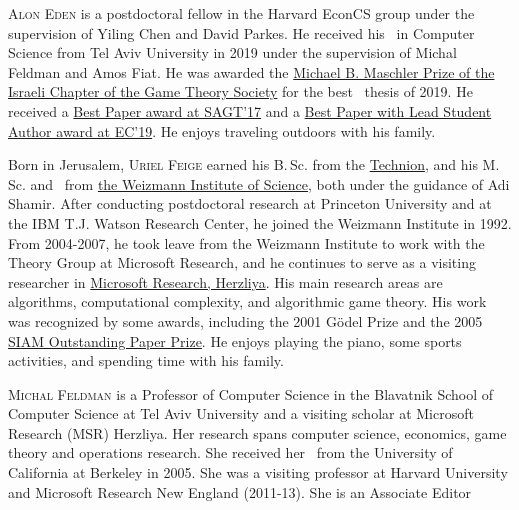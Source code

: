 \documentclass{toc}
\theoremstyle{plain}
\begin{document}
%
%
%
%
%
%
%
%
%
%
%
%
%
%
\begin{tocaboutauthors}
\begin{tocabout}[eden]  %
  \textsc{Alon Eden} is a postdoctoral fellow in the Harvard EconCS group under the supervision of Yiling Chen and David Parkes.  He received his \phd\ in Computer Science from Tel Aviv University in 2019 under the supervision of Michal Feldman and Amos Fiat. He was awarded the \href{https://sites.google.com/view/themichaelbmaschlerprize/recipients}{Michael B. Maschler Prize of the Israeli Chapter of the Game Theory Society} for the best \phd\ thesis of 2019.  He received a \href{https://cs.gssi.it/sagt2017/program.php}{Best Paper award at SAGT'17} and a \href{https://www.sigecom.org/award-paper.html}{Best Paper with Lead Student Author award at EC'19}. He enjoys traveling outdoors with his family.  
\end{tocabout}
\begin{tocabout}[feige]
  Born in Jerusalem, \textsc{Uriel Feige} earned his B.\,Sc. from the \href{https://vee.technion.ac.il}{Technion}, and his M.\,Sc. and \phd\ from \href{http://www.weizmann.ac.il/math}{the Weizmann Institute of Science}, both under the guidance of Adi Shamir. After conducting postdoctoral research at Princeton University and at the IBM T.J. Watson Research Center, he joined the Weizmann Institute in 1992. From 2004-2007, he took leave from the Weizmann Institute to work with
%
the Theory Group at Microsoft Research,  %
and he continues to serve as a visiting researcher in \href{https://www.microsoft.com/en-us/research/group/microsoft-research-new-england-herzliya}{Microsoft Research, %
Herzliya}.  %
His main research areas are algorithms, computational complexity, and algorithmic game theory. His work was recognized by some awards, including the 2001 %
G\"odel  %
Prize and the 2005 \href{https://archive.siam.org/prizes/sponsored/outstanding_paper.php}{SIAM Outstanding Paper Prize}. He enjoys playing the piano, some sports activities, and spending time with his family.
\end{tocabout}
\begin{tocabout}[feldman]
  \textsc{Michal Feldman} is a Professor of Computer Science in the Blavatnik School of Computer Science at Tel Aviv University and a visiting scholar at Microsoft Research (MSR) Herzliya. Her research spans computer science, economics, game theory and operations research. She received her \phd\ from the University of California at Berkeley in 2005. She was a visiting professor at Harvard University and Microsoft Research New England (2011-13).  She is an Associate Editor %

\end{tocabout}
\end{tocaboutauthors}
\end{document}
